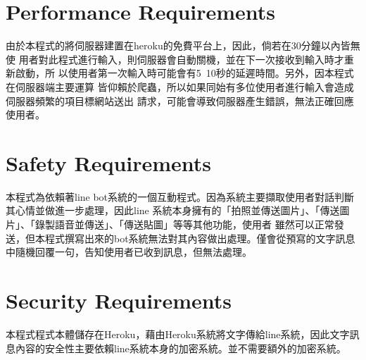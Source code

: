 \documentclass{scrreprt}
\begin{document}
\section{Performance Requirements}
\begin{CJK}{UTF8}{<font>}
由於本程式的將伺服器建置在heroku的免費平台上，因此，倘若在30分鐘以內皆無使
用者對此程式進行輸入，則伺服器會自動關機，並在下一次接收到輸入時才重新啟動，所
以使用者第一次輸入時可能會有5~10秒的延遲時間。另外，因本程式在伺服器端主要運算
皆仰賴於爬蟲，所以如果同始有多位使用者進行輸入會造成伺服器頻繁的項目標網站送出
請求，可能會導致伺服器產生錯誤，無法正確回應使用者。
\end{CJK}

\section{Safety Requirements}
\begin{CJK}{UTF8}{<font>}
本程式為依賴著line bot系統的一個互動程式。因為系統主要擷取使用者對話判斷其心情並做進一步處理，因此line
系統本身擁有的「拍照並傳送圖片」、「傳送圖片」、「錄製語音並傳送」、「傳送貼圖」等等其他功能，使用者
雖然可以正常發送，但本程式撰寫出來的bot系統無法對其內容做出處理。僅會從預寫的文字訊息中隨機回覆一句，告知使用者已收到訊息，但無法處理。
\end{CJK}

\section{Security Requirements}
\begin{CJK}{UTF8}{<font>}
本程式程式本體儲存在Heroku，藉由Heroku系統將文字傳給line系統，因此文字訊息內容的安全性主要依賴line系統本身的加密系統。並不需要額外的加密系統。
\end{CJK}
\end{document}
